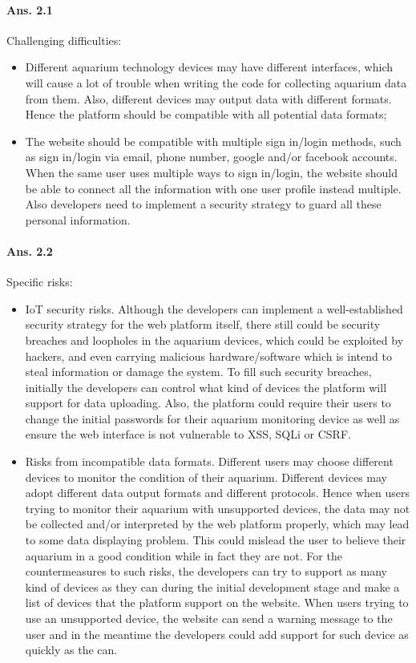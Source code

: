 \documentclass[paper=a4, fontsize=11pt]{scrartcl} %
\numberwithin{equation}{section} %
\numberwithin{figure}{section} %
\numberwithin{table}{section} %
\begin{document}
\paragraph{Ans. 2.1}
Challenging difficulties:
\begin{itemize}
	\item Different aquarium technology devices may have different interfaces, which will cause a lot of trouble when writing the code for collecting aquarium data from them. Also, different devices may output data with different formats. Hence the platform should be compatible with all potential data formats;
	\item The website should be compatible with multiple sign in/login methods, such as sign in/login via email, phone number, google and/or facebook accounts. When the same user uses multiple ways to sign in/login, the website should be able to connect all the information with one user profile instead multiple. Also developers need to implement a security strategy to guard all these personal information.
\end{itemize}
\paragraph{Ans. 2.2} Specific risks:
\begin{itemize}
	\item IoT security risks. Although the developers can implement a well-established security strategy for the web platform itself, there still could be security breaches and loopholes in the aquarium devices, which could be exploited by hackers, and even carrying malicious hardware/software which is intend to steal information or damage the system. To fill such security breaches, initially the developers can control what kind of devices the platform will support for data uploading. Also, the platform could require their users to change the initial passwords for their aquarium monitoring device as well as ensure the web interface is not vulnerable to XSS, SQLi or CSRF\cite{IoTsecurity}. 
	\item Risks from incompatible data formats. Different users may choose different devices to monitor the condition of their aquarium. Different devices may adopt different data output formats and different protocols. Hence when users trying to monitor their aquarium with unsupported devices, the data may not be collected and/or interpreted by the web platform properly, which may lead to some data displaying problem. This could mislead the user to believe their aquarium in a good condition while in fact they are not. For the countermeasures to such risks, the developers can try to support as many kind of devices as they can during the initial development stage and make a list of devices that the platform support on the website. When users trying to use an unsupported device, the website can send a warning message to the user and in the meantime the developers could add support for such device as quickly as the can.
\end{itemize}
\end{document}
